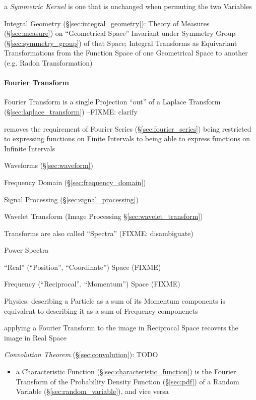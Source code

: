 a \emph{Symmetric Kernel} is one that is unchanged when permuting the two
Variables

\fist Integral Geometry (\S\ref{sec:integral_geometry}): Theory of Measures
(\S\ref{sec:measure}) on ``Geometrical Space'' Invariant under Symmetry Group
(\S\ref{sec:symmetry_group}) of that Space; Integral Transforms as Equivariant
Transformations from the Function Space of one Geometrical Space to another
(e.g. Radon Transformation)



\paragraph{Fourier Transform}\label{sec:fourier_transform}\hfill

Fourier Transform is a single Projection ``out'' of a Laplace Transform
(\S\ref{sec:laplace_transform}) --FIXME: clarify

removes the requirement of Fourier Series (\S\ref{sec:fourier_series}) being
restricted to expressing functions on Finite Intervals to being able to express
functions on Infinite Intervals

\fist Waveforms (\S\ref{sec:waveform})

\fist Frequency Domain (\S\ref{sec:frequency_domain})

\fist Signal Processing (\S\ref{sec:signal_processing})

\fist Wavelet Transform (Image Processing \S\ref{sec:wavelet_transform})

Transforms are also called ``Spectra'' (FIXME: disambiguate)

Power Spectra

``Real'' (``Position'', ``Coordinate'') Space (FIXME)

Frequency (``Reciprocal'', ``Momentum'') Space (FIXME)

Physics: describing a Particle as a sum of its Momentum components is equivalent
to describing it as a sum of Frequency componenets

applying a Fourier Transform to the image in Reciprocal Space recovers the image
in Real Space

\emph{Convolution Theorem} (\S\ref{sec:convolution}): TODO

\begin{itemize}
  \item a Characteristic Function (\S\ref{sec:characteristic_function}) is the
    Fourier Transform of the Probability Density Function (\S\ref{sec:pdf}) of a
    Random Variable (\S\ref{sec:random_variable}), and vice versa
\end{itemize}



